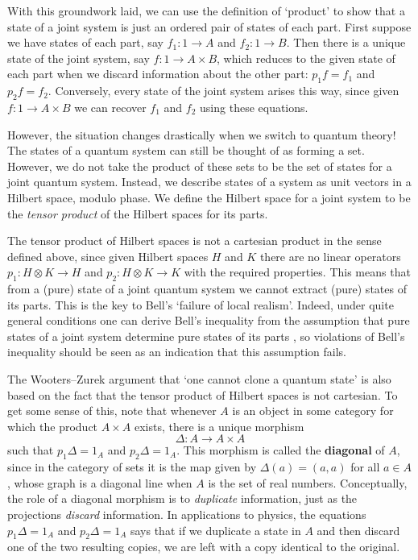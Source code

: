 \documentclass{article}
\renewcommand{\to}{\rightarrow}
\newcommand{\maps}{\colon}
\newcommand{\tensor}{\otimes}
\begin{document}
With this groundwork laid, we can use the definition of `product' to
show that a state of a joint system is just an ordered pair of states
of each part.  First suppose we have states of each part, say $f_1
\maps 1 \to A$ and $f_2 \maps 1 \to B$.  Then there is a unique state
of the joint system, say $f \maps 1 \to A \times B$, which reduces to
the given state of each part when we discard information about the
other part: $p_1 f = f_1$ and $p_2 f = f_2$.  Conversely, every state
of the joint system arises this way, since given $f \maps 1 \to A
\times B$ we can recover $f_1$ and $f_2$ using these equations.

However, the situation changes drastically when we switch to 
quantum theory!  The states of a quantum system can still be 
thought of as forming a set.  However, we do not 
take the product of these sets to be the set of 
states for a joint quantum system.   Instead, we describe 
states of a system as unit vectors in a Hilbert space, modulo
phase.  We define the Hilbert space for a joint system to be the
{\it tensor product} of the Hilbert spaces for its parts.

The tensor product of Hilbert spaces is not a cartesian product
in the sense defined above, since given Hilbert spaces
$H$ and $K$ there are no linear operators
$p_1 \maps H \tensor K \to H$ and $p_2 \maps H \tensor K \to K$
with the required properties.  This means that from a
(pure) state of a joint quantum system we cannot extract 
(pure) states of its parts.  This is the key to Bell's `failure
of local realism'.  Indeed, under quite general conditions
one can derive Bell's inequality from the assumption that pure
states of a joint system determine pure states
of its parts \cite{B0,Bell}, so violations of Bell's inequality should
be seen as an indication that this assumption fails.  

The Wooters--Zurek argument that `one cannot clone a quantum state' 
\cite{WZ} is also based on the fact that the tensor product of Hilbert 
spaces is not cartesian.  To get some sense of this, note that 
whenever $A$ is an object in some category for which the product 
$A \times A$ exists, there is a unique morphism 
\[ \Delta \maps A \to A \times A \]
such that $p_1 \Delta = 1_A$ and $p_2 \Delta = 1_A$.  This morphism is
called the {\bf diagonal} of $A$, since in the category of sets it
is the map given by $\Delta(a) = (a,a)$ for all $a \in A$, whose graph
is a diagonal line when $A$ is the set of real numbers.
Conceptually, the role of a diagonal morphism is to {\it duplicate}
information, just as the projections {\it discard} information.  In
applications to physics, the equations $p_1 \Delta = 1_A$ and 
$p_2 \Delta = 1_A$ says that if we duplicate a state in $A$ and then 
discard one of the two resulting copies, we are left with a copy 
identical to the original.  
\end{document}
